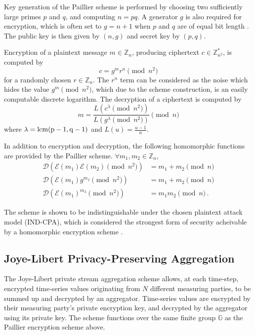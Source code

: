 \documentclass[twocolumn]{autart}
\theoremstyle{definition}
\begin{document}
Key generation of the Paillier scheme is performed by choosing two sufficiently large primes $p$ and $q$, and computing $n=pq$. A generator $g$ is also required for encryption, which is often set to $g=n+1$ when $p$ and $q$ are of equal bit length \cite{}. The public key is then given by $(n, g)$ and secret key by $(p, q)$.

Encryption of a plaintext message $m \in \mathbb{Z}_n$, producing ciphertext $c \in \mathbb{Z}^{*}_{n^2}$, is computed by
\begin{equation}
    c = g^m r^n \pmod{n^2}
\end{equation}
for a randomly chosen $r \in \mathbb{Z}_{n}$. The $r^n$ term can be considered as the noise which hides the value $g^m \pmod{n^2}$, which due to the scheme construction, is an easily computable discrete logarithm. The decryption of a ciphertext is computed by
\begin{equation}
    m = \frac{L(c^\lambda\pmod{n^2})}{L(g^\lambda\pmod{n^2})} \pmod{n}
\end{equation}
where $\lambda = \operatorfont{lcm}(p-1, q-1)$ and $L(u) = \frac{u-1}{n}$.

In addition to encryption and decryption, the following homomorphic functions are provided by the Paillier scheme. $\forall m_1,m_2 \in \mathbb{Z}_n$,
\begin{align}
    \mathcal{D}(\mathcal{E}(m_1)\mathcal{E}(m_2)\!\pmod{n^2}) &= m_1+m_2\!\pmod{n} \\
    \mathcal{D}(\mathcal{E}(m_1)g^{m_2}\!\pmod{n^2}) &= m_1+m_2\!\pmod{n} \\
    \mathcal{D}(\mathcal{E}(m_1)^{m_2}\!\pmod{n^2}) &= m_1m_2\!\pmod{n}\,.
\end{align}

The scheme is shown to be indistinguishable under the chosen plaintext attack model (IND-CPA), which is considered the strongest form of security acheivable by a homomorphic encryption scheme \cite{}.

\subsection{Joye-Libert Privacy-Preserving Aggregation}
The Joye-Libert private stream aggregation scheme allows, at each time-step, encrypted time-series values originating from $N$ different measuring parties, to be summed up and decrypted by an aggregator. Time-series values are encrypted by their measuring party's private encryption key, and decrypted by the aggregator using its private key. The scheme functions over the same finite group $\mathbb{G}$ as the Paillier encryption scheme above.
\end{document}
